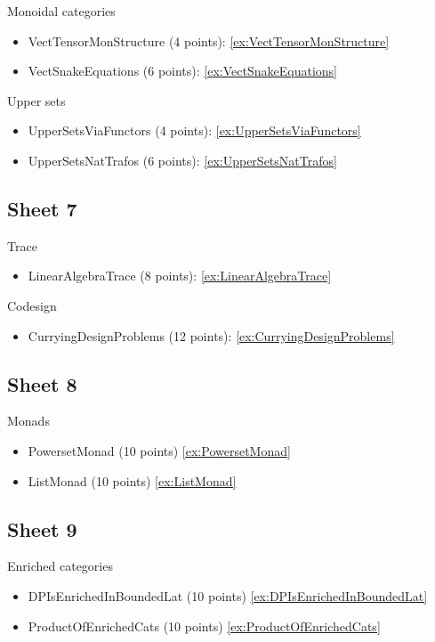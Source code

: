 Monoidal categories
\begin{itemize} 
\item VectTensorMonStructure (4 points): \cref{ex:VectTensorMonStructure}
\item VectSnakeEquations (6 points): \cref{ex:VectSnakeEquations}
\end{itemize}

Upper sets
\begin{itemize}
\item UpperSetsViaFunctors (4 points): \cref{ex:UpperSetsViaFunctors}
\item UpperSetsNatTrafos (6 points): \cref{ex:UpperSetsNatTrafos}
\end{itemize}


\subsection{Sheet 7}

Trace
\begin{itemize}
\item LinearAlgebraTrace (8 points): \cref{ex:LinearAlgebraTrace}
\end{itemize}

Codesign
\begin{itemize} 
\item CurryingDesignProblems (12 points): \cref{ex:CurryingDesignProblems}
\end{itemize}

\subsection{Sheet 8}

Monads
\begin{itemize}
\item PowersetMonad (10 points)  \cref{ex:PowersetMonad}
\item ListMonad (10 points) \cref{ex:ListMonad}
\end{itemize}


\subsection{Sheet 9}

Enriched categories
\begin{itemize}
\item DPIsEnrichedInBoundedLat (10 points)  \cref{ex:DPIsEnrichedInBoundedLat}
\item ProductOfEnrichedCats (10 points) \cref{ex:ProductOfEnrichedCats}
\end{itemize}



